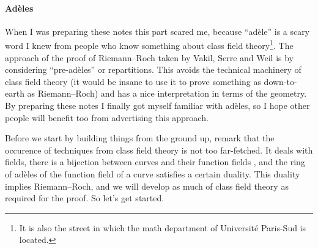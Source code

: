 \documentclass[10pt,a4paper]{article}
\theoremstyle{lecture}
\begin{document}
\paragraph{Ad\`eles}
When I was preparing these notes this part scared me, because ``ad\`ele'' is a scary word I knew from people who know something about class field theory\footnote{It is also the street in which the math department of Universit\'e Paris-Sud is located.}. The approach of the proof of Riemann--Roch taken by Vakil, Serre and Weil is by considering ``pre-ad\`eles'' or repartitions. This avoids the technical machinery of class field theory (it would be insane to use it to prove something as down-to-earth as Riemann--Roch) and has a nice interpretation in terms of the geometry. By preparing these notes I finally got myself familiar with ad\`eles, so I hope other people will benefit too from advertising this approach.

Before we start by building things from the ground up, remark that the occurence of techniques from class field theory is not too far-fetched. It deals with fields, there is a bijection between curves and their function fields \cite[\S I.6]{hartshorne-algebraic-geometry}, and the ring of ad\`eles of the function field of a curve satisfies a certain duality\addreference. This duality implies Riemann--Roch, and we will develop as much of class field theory as required for the proof. So let's get started.
\end{document}
